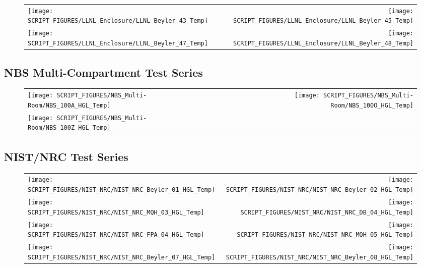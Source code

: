 \begin{figure}[!ht]
\begin{tabular*}{\textwidth}{l@{\extracolsep{\fill}}r}
\texttt{[image: SCRIPT\_FIGURES/LLNL\_Enclosure/LLNL\_Beyler\_43\_Temp]} &
\texttt{[image: SCRIPT\_FIGURES/LLNL\_Enclosure/LLNL\_Beyler\_45\_Temp]} \\
\texttt{[image: SCRIPT\_FIGURES/LLNL\_Enclosure/LLNL\_Beyler\_47\_Temp]} &
\texttt{[image: SCRIPT\_FIGURES/LLNL\_Enclosure/LLNL\_Beyler\_48\_Temp]}
\end{tabular*}
\end{figure}

\clearpage

\subsection{NBS Multi-Compartment Test Series}

\begin{figure}[!ht]
\begin{tabular*}{\textwidth}{l@{\extracolsep{\fill}}r}
\texttt{[image: SCRIPT\_FIGURES/NBS\_Multi-Room/NBS\_100A\_HGL\_Temp]} &
\texttt{[image: SCRIPT\_FIGURES/NBS\_Multi-Room/NBS\_100O\_HGL\_Temp]} \\
\texttt{[image: SCRIPT\_FIGURES/NBS\_Multi-Room/NBS\_100Z\_HGL\_Temp]}
\end{tabular*}
\end{figure}

\clearpage

\subsection{NIST/NRC Test Series}

\begin{figure}[!ht]
\begin{tabular*}{\textwidth}{l@{\extracolsep{\fill}}r}
\texttt{[image: SCRIPT\_FIGURES/NIST\_NRC/NIST\_NRC\_Beyler\_01\_HGL\_Temp]} &
\texttt{[image: SCRIPT\_FIGURES/NIST\_NRC/NIST\_NRC\_Beyler\_02\_HGL\_Temp]} \\
\texttt{[image: SCRIPT\_FIGURES/NIST\_NRC/NIST\_NRC\_MQH\_03\_HGL\_Temp]} &
\texttt{[image: SCRIPT\_FIGURES/NIST\_NRC/NIST\_NRC\_DB\_04\_HGL\_Temp]} \\
\texttt{[image: SCRIPT\_FIGURES/NIST\_NRC/NIST\_NRC\_FPA\_04\_HGL\_Temp]} &
\texttt{[image: SCRIPT\_FIGURES/NIST\_NRC/NIST\_NRC\_MQH\_05\_HGL\_Temp]} \\
\texttt{[image: SCRIPT\_FIGURES/NIST\_NRC/NIST\_NRC\_Beyler\_07\_HGL\_Temp]} &
\texttt{[image: SCRIPT\_FIGURES/NIST\_NRC/NIST\_NRC\_Beyler\_08\_HGL\_Temp]}
\end{tabular*}
\end{figure}

